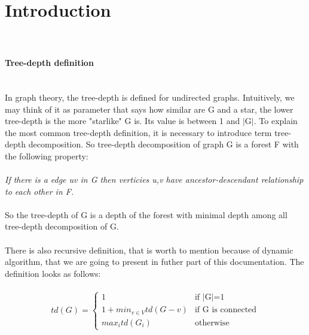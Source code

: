 \section{Introduction}
\paragraph{\\\\Tree-depth definition\\\\}
In graph theory, the tree-depth is defined for undirected graphs. Intuitively, we may think of it as parameter that says how similar are G and a star, the lower tree-depth is the more "starlike" G is. Its value is between 1 and $|$G$|$. To explain the most common tree-depth definition, it is necessary to introduce term tree-depth decomposition. So tree-depth decomposition of graph G is a forest F with the following property:\\\\
\emph{If there is a edge uv in G then verticies u,v have ancestor-descendant relationship to each other in F.}\\\\
So the tree-depth of G is a depth of the forest with minimal depth among all tree-depth decomposition of G.\\\\
There is also recursive definition, that is worth to mention because of dynamic algorithm, that we are going to present in futher part of this documentation. The definition looks as follows:\\\\
\begin{equation}
td(G) =
\begin{cases}
1 & \text{if $|$G$|$=1}\\
1+min_{v \in V} td(G-v) & \text{if G is connected}\\
max_{i} td(G_{i})  & \text{otherwise}
\end{cases}       
\end{equation}
\\\\
